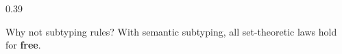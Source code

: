 \begin{frame}
\begin{columns}[T,onlytextwidth]
\begin{column}{0.39\textwidth}
\begin{block}{Why not subtyping rules?}
      \smallskip
      With semantic subtyping, all set-theoretic laws hold for \textbf{free}.
    \end{block}
  \end{column}
\end{columns}

\end{frame}
